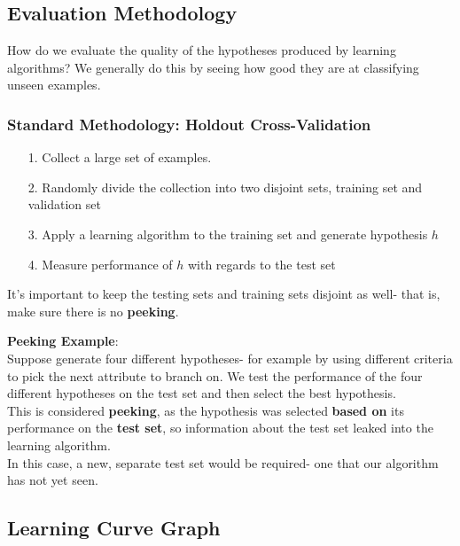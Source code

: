 \documentclass[english, 10pt]{article}
\begin{document}
\subsection{Evaluation Methodology}

How do we evaluate the quality of the hypotheses produced by learning algorithms? We generally do this by seeing how good they are at classifying unseen examples.

\subsubsection{Standard Methodology: Holdout Cross-Validation}

\begin{itemize}
	\item[1.] Collect a large set of examples.
	\item[2.] Randomly divide the collection into two disjoint sets, training set and validation set
	\item[3.] Apply a learning algorithm to the training set and generate hypothesis $h$
	\item[4.] Measure performance of $h$ with regards to the test set
\end{itemize}

It's important to keep the testing sets and training sets disjoint as well- that is, make sure there is no \textbf{peeking}.\\

\begin{myproof}
\textbf{Peeking Example}:\\
Suppose generate four different hypotheses- for example by using different criteria to pick the next attribute to branch on.
We test the performance of the four different hypotheses on the test set and then select the best hypothesis.\\

This is considered \textbf{peeking}, as the hypothesis was selected \textbf{based on} its performance on the \textbf{test set}, so information about the test set leaked into the learning algorithm.\\

In this case, a new, separate test set would be required- one that our algorithm has not yet seen.
\end{myproof}

\subsection{Learning Curve Graph}
\end{document}
